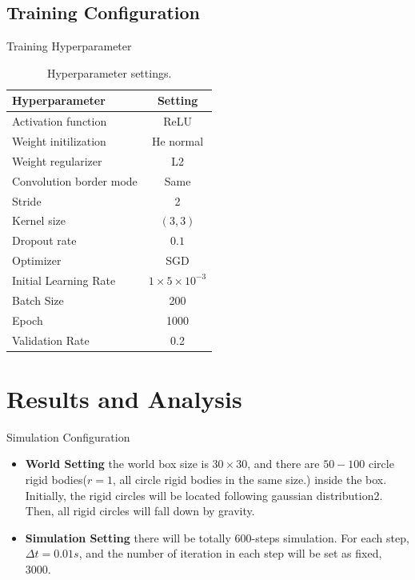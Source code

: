 \documentclass{beamer}
\begin{document}
\subsection{Training Configuration}
\begin{frame}{Training Hyperparameter}
\begin{table}[h!]
        \centering
        \begin{tabular}{ l | c  }
            Hyperparameter  & Setting \\ \hline
            Activation function & ReLU \\
            Weight initilization & He normal \\
            Weight regularizer &  L2 \\
            Convolution border mode  & Same \\
            Stride & 2 \\ 
            Kernel size & $(3, 3)$ \\
            Dropout rate & $0.1$ \\
            Optimizer & SGD \\
            Initial Learning Rate & $1\times 5\times10^{-3}$ \\
            Batch Size & 200 \\
            Epoch & 1000 \\
            Validation Rate & 0.2 \\
        \end{tabular}
        \caption{Hyperparameter settings.}
        \label{table:hyper}
\end{table}
\end{frame}

\section{Results and Analysis}

\begin{frame}{Simulation Configuration}
\begin{itemize}
\item {
\textbf{World Setting}
\pause
the world box size is $30 \times 30$, and there are $50-100$ circle rigid bodies($r = 1$, all circle rigid bodies in the same size.) inside the box. Initially, the rigid circles will be located following gaussian distribution2. Then, all rigid circles will fall down by gravity.
\pause
}
\item {
\textbf{Simulation Setting}
\pause
there will be totally 600-steps simulation. For each step, $\Delta t = 0.01s$, and the number of iteration in each step will be set as fixed, 3000.
}

\end{itemize}
\end{frame}
\end{document}
